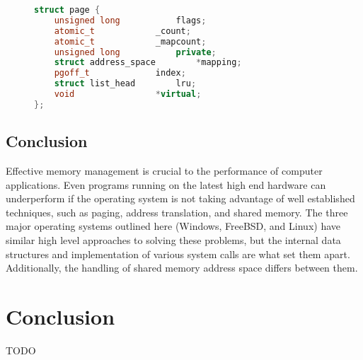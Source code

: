 \documentclass[letterpaper,draftclsnofoot,10pt,onecolumn,titlepage]{IEEEtran}\usepackage[margin=0.75in]{geometry}
\begin{document}
\begin{figure}[H]
\begin{lstlisting}[language=C++]
struct page {
	unsigned long 			flags;
	atomic_t			_count;
	atomic_t			_mapcount;
	unsigned long			private;
	struct address_space		*mapping;
	pgoff_t				index;
	struct list_head		lru;
	void				*virtual;
};
\end{lstlisting}
\end{figure}


    \subsection{Conclusion}
    Effective memory management is crucial to the performance of computer applications. Even programs 
    running on the latest high end hardware can underperform if the operating system is not taking 
    advantage of well established techniques, such as paging, address translation, and shared memory.
    The three major operating systems outlined here (Windows, FreeBSD, and Linux) have similar high level
    approaches to solving these problems, but the internal data structures and implementation of various
    system calls are what set them apart. Additionally, the handling of shared memory address space differs
    between them.


\section{Conclusion}
TODO




\end{document}

